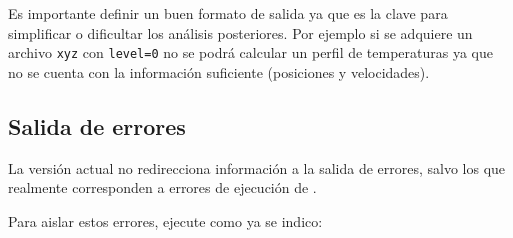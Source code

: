 Es importante definir un buen formato de salida ya que es la clave para simplificar o dificultar los an\'alisis posteriores. Por ejemplo si se adquiere un archivo \verb|xyz| con \verb|level=0| no se podr\'a calcular un perfil de temperaturas ya que no se cuenta con la informaci\'on suficiente (posiciones y velocidades).


\subsection{Salida de errores}
La versi\'on actual no redirecciona informaci\'on a la salida de errores, salvo los que realmente corresponden a errores de ejecuci\'on de \lpmd.

Para aislar estos errores, ejecute \lpmd como ya se indico:


